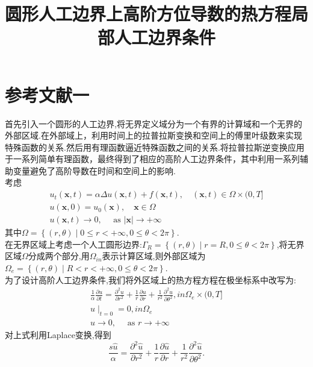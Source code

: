 \documentclass[a4paper,15pt,twoside,zihao=-4]{article}
\title{\bf{圆形人工边界上高阶方位导数的热方程局部人工边界条件}}
\author{}
\begin{document}
\kaishu{}
\maketitle
\section*{参考文献一}
\indent 首先引入一个圆形的人工边界,将无界定义域分为一个有界的计算域和一个无界的外部区域.在外部域上，利用时间上的拉普拉斯变换和空间上的傅里叶级数来实现特殊函数的关系.然后用有理函数逼近特殊函数之间的关系.将拉普拉斯逆变换应用于一系列简单有理函数，最终得到了相应的高阶人工边界条件，其中利用一系列辅助变量避免了高阶导数在时间和空间上的影响.\\
\indent 考虑
\begin{equation}
\begin{array}{l}
u_{t}(\mathbf{x}, t)=\alpha \Delta u(\mathbf{x}, t)+f(\mathbf{x}, t), \quad(\mathbf{x}, t) \in \Omega \times(0, T] \\
u(\mathbf{x}, 0)=u_{0}(\mathbf{x}), \quad \mathbf{x} \in \Omega \\
u(\mathbf{x}, t) \rightarrow 0, \quad \text { as }|\mathbf{x}| \rightarrow+\infty
\end{array}
\end{equation}
其中$\Omega=\left\{(r,\theta )\mid0\le r<+\infty ,0\le\theta <2\pi \right\}.$\\
\indent 在无界区域上考虑一个人工圆形边界:$\Gamma_R=\left\{(r,\theta )\mid r=R,0\le\theta <2\pi \right\}$,将无界区域$\Omega$分成两个部分,用$\Omega_{in}$表示计算区域,则外部区域为$\Omega_e=\left\{(r,\theta )\mid R<r<+\infty,0\le\theta <2\pi \right\}$.\\
\indent 为了设计高阶人工边界条件,我们将外区域上的热方程方程在极坐标系中改写为:
\begin{equation}
\begin{array}{l}
\displaystyle\frac{1}{\alpha} \frac{\partial u}{\partial t}=\frac{\partial^2u}{\partial r^2}+
\frac{1}{r}\frac{\partial u}{\partial r}+\frac{1}{r^2}\frac{\partial^2u}{\partial \theta^2}, in \Omega_e \times(0, T] \\
u\mid_{t=0}=0, in \Omega_e \\
u\rightarrow 0, \quad \text { as }r\rightarrow+\infty
\end{array}
\end{equation}
\indent 对上式利用Laplace变换,得到\\
\begin{equation}
\frac{s\hat{u}}{\alpha}= \frac{\partial^2\hat{u}}{\partial r^2}+
\frac{1}{r}\frac{\partial \hat{u}}{\partial r}+\frac{1}{r^2}\frac{\partial^2\hat{u}}{\partial \theta^2}.
\end{equation}
\end{document}
